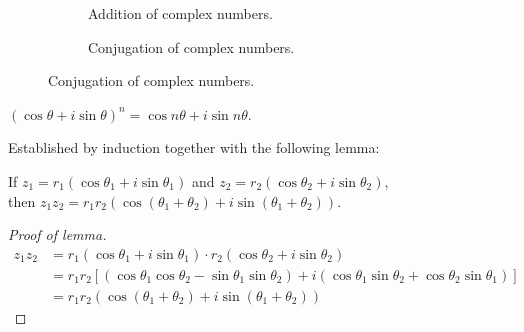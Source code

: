 \documentclass{../template/note}
\begin{document}
    \begin{figure}[ht]
        \centering
        \hfill
        \begin{subfigure}[t]{0.4\textwidth}
            \caption{Addition of complex numbers.}
            \label{fig:argand-addition}
        \end{subfigure}
        \hfill
        \begin{subfigure}[t]{0.35\textwidth}
            \caption{Conjugation of complex numbers.}
            \label{fig:argand-conjugation}
        \end{subfigure}
        \hfill
    \end{figure}


    \begin{theorem}[de Moivre]
        \label{de-moivre-theorem}
        \((\cos \theta + i \sin \theta)^n = \cos n\theta + i \sin n\theta\).
    \end{theorem}

    \noindent Established by induction together with the following lemma:

    \begin{lemma}
        If \(z_1=r_1(\cos \theta_1 + i \sin \theta_1)\) and \(z_2=r_2(\cos \theta_2 + i \sin \theta_2)\), \\ then \(z_1z_2 = r_1r_2\left(\cos(\theta_1 + \theta_2) + i \sin(\theta_1+\theta_2)\right)\).
    \end{lemma}

    \begin{proof}[Proof of lemma]
        \begin{align*}
            z_1z_2 &= r_1(\cos \theta_1 + i \sin \theta_1) \cdot r_2(\cos \theta_2 + i \sin \theta_2) \\
            &= r_1r_2\left[(\cos \theta_1 \cos \theta_2 - \sin \theta_1 \sin \theta_2)+i(\cos \theta_1 \sin \theta_2 + \cos \theta_2 \sin \theta_1)\right] \\
            &= r_1r_2(\cos(\theta_1 + \theta_2) + i \sin(\theta_1 + \theta_2))
        \end{align*} 
    \end{proof}
\end{document}
